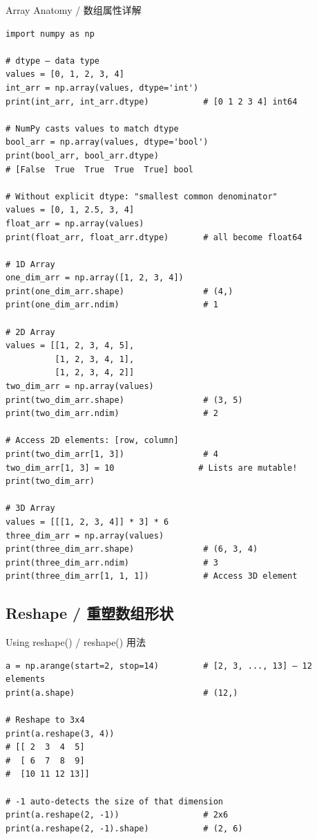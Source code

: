 \documentclass[11pt,a4paper]{article}
\begin{document}
\begin{examplebox}{Array Anatomy / 数组属性详解}
\begin{lstlisting}
import numpy as np

# dtype — data type
values = [0, 1, 2, 3, 4]
int_arr = np.array(values, dtype='int')
print(int_arr, int_arr.dtype)           # [0 1 2 3 4] int64

# NumPy casts values to match dtype
bool_arr = np.array(values, dtype='bool')
print(bool_arr, bool_arr.dtype)
# [False  True  True  True  True] bool

# Without explicit dtype: "smallest common denominator"
values = [0, 1, 2.5, 3, 4]
float_arr = np.array(values)
print(float_arr, float_arr.dtype)       # all become float64

# 1D Array
one_dim_arr = np.array([1, 2, 3, 4])
print(one_dim_arr.shape)                # (4,)
print(one_dim_arr.ndim)                 # 1

# 2D Array
values = [[1, 2, 3, 4, 5],
          [1, 2, 3, 4, 1],
          [1, 2, 3, 4, 2]]
two_dim_arr = np.array(values)
print(two_dim_arr.shape)                # (3, 5)
print(two_dim_arr.ndim)                 # 2

# Access 2D elements: [row, column]
print(two_dim_arr[1, 3])                # 4
two_dim_arr[1, 3] = 10                 # Lists are mutable!
print(two_dim_arr)

# 3D Array
values = [[[1, 2, 3, 4]] * 3] * 6
three_dim_arr = np.array(values)
print(three_dim_arr.shape)              # (6, 3, 4)
print(three_dim_arr.ndim)               # 3
print(three_dim_arr[1, 1, 1])           # Access 3D element
\end{lstlisting}
\end{examplebox}

\subsection{Reshape / 重塑数组形状}

\begin{examplebox}{Using reshape() / reshape() 用法}
\begin{lstlisting}
a = np.arange(start=2, stop=14)         # [2, 3, ..., 13] — 12 elements
print(a.shape)                          # (12,)

# Reshape to 3x4
print(a.reshape(3, 4))
# [[ 2  3  4  5]
#  [ 6  7  8  9]
#  [10 11 12 13]]

# -1 auto-detects the size of that dimension
print(a.reshape(2, -1))                 # 2x6
print(a.reshape(2, -1).shape)           # (2, 6)
\end{lstlisting}
\end{examplebox}
\end{document}
